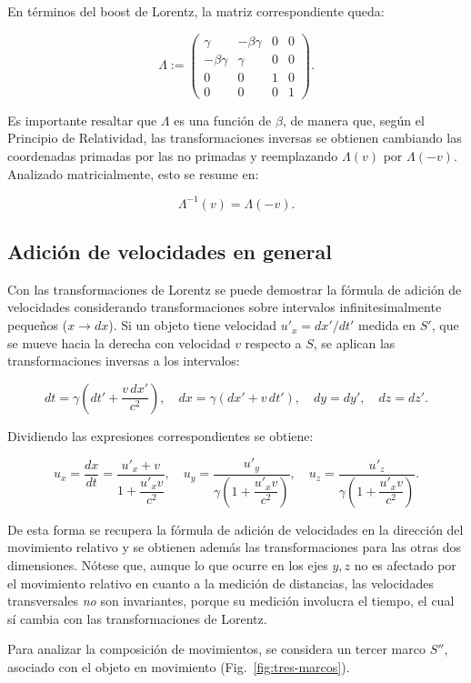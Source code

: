 En términos del boost de Lorentz, la matriz correspondiente queda:

$$
\Lambda := \left(\begin{array}{cccc}
\gamma & -\beta\gamma & 0 & 0 \\
-\beta\gamma & \gamma & 0 & 0 \\
0 & 0 & 1 & 0 \\
0 & 0 & 0 & 1
\end{array}\right).
$$

Es importante resaltar que $\Lambda$ es una función de $\beta$, de manera que, según el Principio de Relatividad, las transformaciones inversas se obtienen cambiando las coordenadas primadas por las no primadas y reemplazando $\Lambda(v)$ por $\Lambda(-v)$. Analizado matricialmente, esto se resume en:

$$
\Lambda^{-1}(v) = \Lambda(-v).
$$

\subsection{Adición de velocidades en general}

Con las transformaciones de Lorentz se puede demostrar la fórmula de adición de velocidades considerando transformaciones sobre intervalos infinitesimalmente pequeños ($x \to dx$). Si un objeto tiene velocidad $u'_x = dx'/dt'$ medida en $S'$, que se mueve hacia la derecha con velocidad $v$ respecto a $S$, se aplican las transformaciones inversas a los intervalos:

$$
dt = \gamma\left(dt' + \frac{v\,dx'}{c^2}\right), \quad dx = \gamma(dx' + v\,dt'), \quad dy = dy', \quad dz = dz'.
$$

Dividiendo las expresiones correspondientes se obtiene:

$$
u_x = \frac{dx}{dt} = \frac{u'_x + v}{1 + \dfrac{u'_x v}{c^2}}, \quad
u_y = \frac{u'_y}{\gamma\left(1 + \dfrac{u'_x v}{c^2}\right)}, \quad
u_z = \frac{u'_z}{\gamma\left(1 + \dfrac{u'_x v}{c^2}\right)}.
$$

De esta forma se recupera la fórmula de adición de velocidades en la dirección del movimiento relativo y se obtienen además las transformaciones para las otras dos dimensiones. Nótese que, aunque lo que ocurre en los ejes $y, z$ no es afectado por el movimiento relativo en cuanto a la medición de distancias, las velocidades transversales \textit{no} son invariantes, porque su medición involucra el tiempo, el cual sí cambia con las transformaciones de Lorentz.

Para analizar la composición de movimientos, se considera un tercer marco $S''$, asociado con el objeto en movimiento (Fig.~\ref{fig:tres-marcos}).

